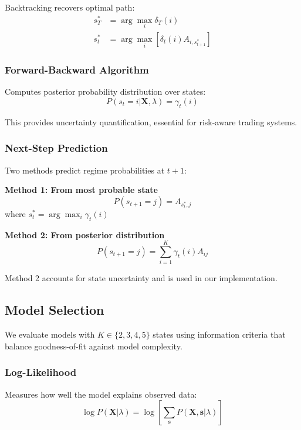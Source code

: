\documentclass[conference]{IEEEtran}
\begin{document}
Backtracking recovers optimal path:
\begin{align}
s_T^* &= \arg\max_i \delta_T(i) \\
s_t^* &= \arg\max_i \left[\delta_t(i)A_{i,s_{t+1}^*}\right]
\end{align}

\subsubsection{Forward-Backward Algorithm}
Computes posterior probability distribution over states:
\begin{equation}
P(s_t=i | \mathbf{X}, \lambda) = \gamma_t(i)
\end{equation}

This provides uncertainty quantification, essential for risk-aware trading systems.

\subsubsection{Next-Step Prediction}
Two methods predict regime probabilities at $t+1$:

\textbf{Method 1: From most probable state}
\begin{equation}
P(s_{t+1}=j) = A_{s_t^*, j}
\end{equation}
where $s_t^* = \arg\max_i \gamma_t(i)$

\textbf{Method 2: From posterior distribution}
\begin{equation}
P(s_{t+1}=j) = \sum_{i=1}^{K}\gamma_t(i)A_{ij}
\end{equation}

Method 2 accounts for state uncertainty and is used in our implementation.

\subsection{Model Selection}

We evaluate models with $K \in \{2, 3, 4, 5\}$ states using information criteria that balance goodness-of-fit against model complexity.

\subsubsection{Log-Likelihood}
Measures how well the model explains observed data:
\begin{equation}
\log P(\mathbf{X}|\lambda) = \log\left[\sum_{\mathbf{s}}P(\mathbf{X}, \mathbf{s}|\lambda)\right]
\end{equation}
\end{document}
